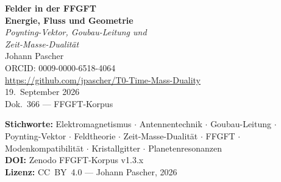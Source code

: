 \documentclass[11pt,oneside]{book}
\begin{document}
\frontmatter
\begin{titlepage}
  \centering\vspace*{1.2cm}
  {\Large\bfseries\color{blue!70!black}
    Felder in der FFGFT}\\[0.5cm]
  {\large\bfseries\color{blue!40!black}
    Energie, Fluss und Geometrie}\\[0.8cm]
  {\normalsize\itshape
    Poynting-Vektor, Goubau-Leitung und\\
    Zeit-Masse-Dualität}\\[1.5cm]
  {\large Johann Pascher}\\[0.3cm]
  {\small ORCID: 0009-0000-6518-4064}\\[0.3cm]
  {\small\url{https://github.com/jpascher/T0-Time-Mass-Duality}}\\[1.2cm]
  {\small 19.~September 2026}\\[0.5cm]
  {\small Dok.~366 --- FFGFT-Korpus}
\end{titlepage}

\newpage\thispagestyle{empty}
{\small\noindent
\textbf{Stichworte:} Elektromagnetismus $\cdot$
Antennentechnik $\cdot$ Goubau-Leitung $\cdot$
Poynting-Vektor $\cdot$ Feldtheorie $\cdot$
Zeit-Masse-Dualität $\cdot$ FFGFT $\cdot$
Modenkompatibilität $\cdot$ Kristallgitter $\cdot$
Planetenresonanzen\\[1em]
\textbf{DOI:} Zenodo FFGFT-Korpus v1.3.x\\[1em]
\textbf{Lizenz:} CC~BY~4.0 --- Johann Pascher, 2026
}

\newpage
\tableofcontents

\mainmatter
\renewcommand{\thechapter}{}
\renewcommand{\thesection}{\arabic{section}}


\end{document}
